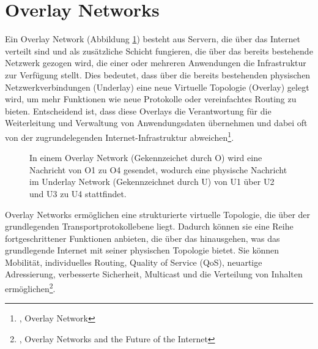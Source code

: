 \section{Overlay Networks}
\label{chap:overlay_networks}

Ein Overlay Network (Abbildung \ref{imgs:overlay_network}) besteht aus Servern, die über das Internet verteilt sind und als zusätzliche Schicht fungieren, die über das bereits bestehende Netzwerk gezogen wird, die einer oder mehreren Anwendungen die Infrastruktur zur Verfügung stellt. Dies bedeutet, dass über die bereits bestehenden physischen Netzwerkverbindungen (Underlay) eine neue Virtuelle Topologie (Overlay) gelegt wird, um mehr Funktionen wie neue Protokolle oder vereinfachtes Routing zu bieten. Entscheidend ist, dass diese Overlays die Verantwortung für die Weiterleitung und Verwaltung von Anwendungsdaten übernehmen und dabei oft von der zugrundelegenden Internet-Infrastruktur abweichen\footnote{\cite{OverlayNetwork}, Overlay Network}.

\begin{figure}[h!]
    \centering
    
    \caption{In einem Overlay Network (Gekennzeichet durch O) wird eine Nachricht von O1 zu O4 gesendet, wodurch eine physische Nachricht im Underlay Network (Gekennzeichnet durch U) von U1 über U2 und U3 zu U4 stattfindet.}
    \label{imgs:overlay_network}
\end{figure}

Overlay Networks ermöglichen eine strukturierte virtuelle Topologie, die über der grundlegenden Transportprotokollebene liegt. Dadurch können sie eine Reihe fortgeschrittener Funktionen anbieten, die über das hinausgehen, was das grundlegende Internet mit seiner physischen Topologie bietet. Sie können Mobilität, individuelles Routing, Quality of Service (QoS), neuartige Adressierung, verbesserte Sicherheit, Multicast und die Verteilung von Inhalten ermöglichen\footnote{\cite{FutureOfTheInternet}, Overlay Networks and the Future of the Internet}.
